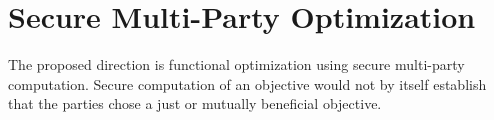 \chapter{Secure Multi-Party Optimization}
\label{chap:secure-multiparty-optimization}


The proposed direction is functional optimization using secure multi-party
computation. Secure computation of an objective would not by itself establish
that the parties chose a just or mutually beneficial objective.
